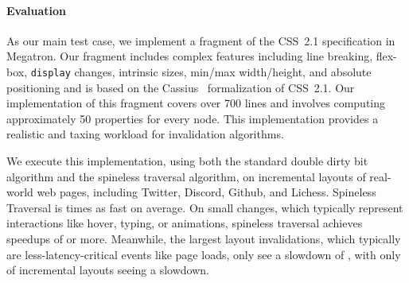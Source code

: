 \paragraph{Evaluation}
As our main test case, we implement a fragment of the CSS~2.1 specification in Megatron. Our fragment includes complex features including line breaking, flex-box, \texttt{display} changes, intrinsic sizes, min/max width/height, and absolute positioning and is based on the Cassius~\cite{cassius-1} formalization of CSS~2.1. Our implementation of this fragment covers over 700 lines and involves computing approximately 50 properties for every node. This implementation provides a realistic and taxing workload for invalidation algorithms.

We execute this implementation, using both the standard double dirty bit algorithm and the spineless traversal algorithm, on  \TotalDiffCount incremental layouts of \TotalTraceCount real-world web pages, including Twitter, Discord, Github, and Lichess. Spineless Traversal is \DBPQoverhead times as fast on average. On small changes, which typically represent interactions like hover, typing, or animations, spineless traversal achieves speedups of \todo{$10\times$} or more. Meanwhile, the largest layout invalidations, which typically are less-latency-critical events like page loads, only see a slowdown of , with only  of incremental layouts seeing a slowdown.
